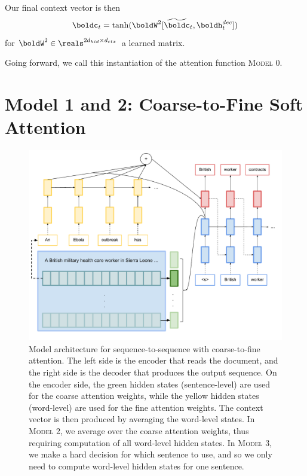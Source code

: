 \documentclass[12pt]{report}
\begin{document}
Our final context vector is then
\begin{equation}
\boldc_t = \tanh(\boldW^2[\widetilde{\boldc}_t, \boldh_t^{dec}])
\end{equation}
for $\boldW^2 \in \reals^{2d_{hid} \times d_{ctx}}$ a learned matrix.

Going forward, we call this instantiation of the attention function \textsc{Model 0}.


\section{Model 1 and 2: Coarse-to-Fine Soft Attention}

\begin{figure}
\includegraphics[width=\textwidth]{images/coarse_to_fine.pdf}
\caption[Coarse-to-Fine Attention Model]{Model architecture for sequence-to-sequence with coarse-to-fine attention. The left side is the encoder that reads the document, and the right side is the decoder that produces the output sequence. On the encoder side, the green hidden states (sentence-level) are used for the coarse attention weights, while the yellow hidden states (word-level) are used for the fine attention weights. The context vector is then produced by averaging the word-level states. In \textsc{Model 2}, we average over the coarse attention weights, thus requiring computation of all word-level hidden states. In \textsc{Model 3}, we make a hard decision for which sentence to use, and so we only need to compute word-level hidden states for one sentence.}
\label{fig:coarsetofine}
\end{figure}
\end{document}
